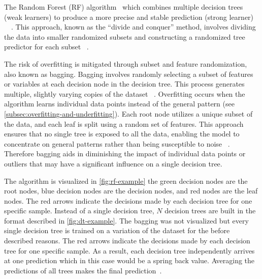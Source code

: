 {The Random Forest (RF) algorithm~\cite[]{breiman_randomforests_2001} which combines multiple decision trees (weak
learners) to produce a more precise and stable prediction (strong learner)
~\cite[p. 24]{awad_efficientlearningmachines_2015}~\cite[pp. 340]{gareth2013introduction}.
This approach, known as the ``divide and conquer'' method, involves dividing the data into smaller randomized subsets
and constructing a randomized tree predictor for each subset
~\cite[p. 251]{liu_newmachinelearning_2012}.

The risk of overfitting is mitigated through subset and feature randomization, also known as bagging.
Bagging involves randomly selecting a subset of features or variables at each decision node in the decision
tree.
This process generates multiple, slightly varying copies of the dataset
~\cite[p. 341]{gareth2013introduction}.
Overfitting occurs when the algorithm learns individual data points instead of
the general pattern (see \cref{subsec:overfitting-and-underfitting}).
Each root node utilizes a unique subset of the data, and each leaf is split using a random set of features.
This approach ensures that no single tree is exposed to all the data, enabling the model to concentrate on general
patterns rather than being susceptible to noise
~\cite[p. 83]{muller_introductionmachinelearning_2016}.
Therefore bagging aids in diminishing the impact of individual data points or outliers that may have a
significant influence on a single decision tree.

The algorithm is visualized in \cref{fig:rf-example} the green decision nodes are the root nodes, blue decision nodes
are the decision nodes, and red nodes are the leaf nodes.
The red arrows indicate the decisions made by each decision tree for one specific sample.
Instead of a single decision tree, $N$ decision trees are built in the format described in \cref{fig:dt-example}.
The bagging was not visualized but every single decision tree is trained on a variation of the dataset for the before
described reasons.
The red arrows indicate the decisions made by each decision tree for one specific sample.
As a result, each decision tree independently arrives at one prediction which in this case would be a spring back value.
Averaging the predictions of all trees makes the final prediction~\cite[p. 9]{breiman_randomforests_2001}.

}
